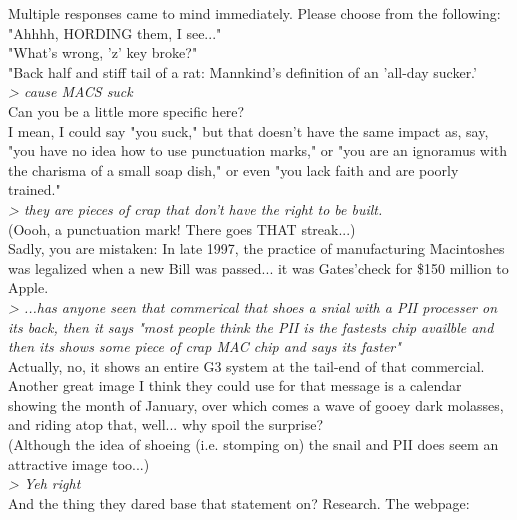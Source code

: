 \documentclass[11pt,twoside,a4paper]{article}
\begin{document}
\begin{multicols*}{2}
Multiple responses came to mind immediately. Please choose from the following:~\\
"Ahhhh, HORDING them, I see..."~\\
"What's wrong, 'z' key broke?"~\\
"Back half and stiff tail of a rat: Mannkind's definition of an 'all-day sucker.'~\\

\emph{> cause MACS suck}~\\

Can you be a little more specific here?~\\

I mean, I could say "you suck," but that doesn't have the same impact as, say, "you have no idea how to use punctuation marks," or "you are an ignoramus with the charisma of a small soap dish," or even "you lack faith and are poorly trained."~\\

\emph{> they are pieces of crap that don't have the right to be built.}~\\

(Oooh, a punctuation mark! There goes THAT streak...)~\\

Sadly, you are mistaken: In late 1997, the practice of manufacturing Macintoshes was legalized when a new Bill was passed... it was Gates'check for \$150 million to Apple.~\\

\emph{> ...has anyone seen that commerical that shoes a snial with a PII processer on its back, then it says "most people think the PII is the fastests chip availble and then its shows some piece of crap MAC chip and says its faster"}~\\

Actually, no, it shows an entire G3 system at the tail-end of that commercial. Another great image I think they could use for that message is a calendar showing the month of January, over which comes a wave of gooey dark molasses, and riding atop that, well... why spoil the surprise?~\\

(Although the idea of shoeing (i.e. stomping on) the snail and PII does seem an attractive image too...)~\\

\emph{> Yeh right}~\\

And the thing they dared base that statement on? Research. The webpage:~\\


\end{multicols*}
\end{document}
